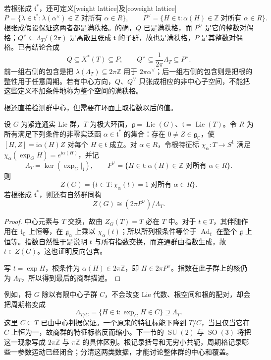 若根张成 \(\mathfrak t^*\)，还可定义[weight lattice]及[coweight lattice]
\[
	P=\{\lambda\in\mathfrak t^*:\lambda(\alpha^\vee)\in\mathbb Z
	\;\text{对所有 }\alpha\in R\},\qquad
	P^\vee=\{H\in\mathfrak t:\alpha(H)\in\mathbb Z
	\;\text{对所有 }\alpha\in R\}.
\]
根张成假设保证这两者都是满秩格。的确，\(Q\) 已是满秩格，而 \(P^\vee\) 是它的整数对偶格；\(Q^\vee\subseteq\Lambda_T/(2\pi)\) 是离散且张成 \(\mathfrak t\) 的子群，故也是满秩格，\(P\) 是其整数对偶格。已有结论合成
\begin{equation}\label{g1:eq:root-lattice-inclusions}
	Q\subseteq X^*(T)\subseteq P,
	\qquad
	Q^\vee\subseteq\frac1{2\pi}\Lambda_T\subseteq P^\vee.
\end{equation}
前一组右侧的包含是把 \(\lambda(\Lambda_T)\subseteq2\pi\mathbb Z\) 用于 \(2\pi\alpha^\vee\)；后一组右侧的包含则是把根的整性用于任意周期。若有中心方向，\(Q\)、\(Q^\vee\) 只张成相应的非中心子空间，不能把这些定义不加条件地称为整个空间的满秩格。

\ProseParagraphBreak
根还直接检测群中心，但需要在环面上取指数以后的值。

\begin{proposition}\label{g1:prop:center-from-roots}
	设 \(G\) 为紧连通实 Lie 群，\(T\) 为极大环面，\(\mathfrak g=\operatorname{Lie}(G)\)、\(\mathfrak t=\operatorname{Lie}(T)\)。令 \(R\) 为所有满足下列条件的非零实泛函 \(\alpha\in\mathfrak t^*\) 的集合：存在 \(0\ne Z\in\mathfrak g_{\mathbb C}\)，使 \([H,Z]=\mathrm{i}\alpha(H)Z\) 对每个 \(H\in\mathfrak t\) 成立。对 \(\alpha\in R\)，令根特征标 \(\chi_\alpha:T\to S^1\) 满足 \(\chi_\alpha(\exp_G H)=e^{\mathrm{i}\alpha(H)}\)，并记
	\[
		\Lambda_T=\ker(\exp_G|_{\mathfrak t}),\qquad
		P^\vee=\{H\in\mathfrak t:\alpha(H)\in\mathbb Z\text{ 对所有 }\alpha\in R\}.
	\]
	则
	\[
		Z(G)=\{t\in T:\chi_\alpha(t)=1\;\text{对所有 }\alpha\in R\}.
	\]
	若根张成 \(\mathfrak t^*\)，则还有自然群同构
	\[
		Z(G)\cong (2\pi P^\vee)/\Lambda_T.
	\]
\end{proposition}
\begin{proof}
	中心元素与 \(T\) 交换，故由 \(Z_G(T)=T\) 必在 \(T\) 中。对于 \(t\in T\)，其伴随作用在 \(\mathfrak t_{\mathbb C}\) 上恒等，在 \(\mathfrak g_\alpha\) 上乘以 \(\chi_\alpha(t)\)；所以所列根条件等价于 \(\operatorname{Ad}_t\) 在整个 \(\mathfrak g\) 上恒等。指数自然性于是说明 \(t\) 与所有指数交换，而连通群由指数生成，故 \(t\in Z(G)\)。这也证明反向包含。

	写 \(t=\exp H\)，根条件为 \(\alpha(H)\in2\pi\mathbb Z\)，即 \(H\in2\pi P^\vee\)。指数在此子群上的核仍为 \(\Lambda_T\)，所以得到最后的商群描述。
\end{proof}

例如，将 \(G\) 除以有限中心子群 \(C\)，不会改变 Lie 代数、根空间和根的配对，却会把周期格变成
\[
	\Lambda_{T/C}=\{H\in\mathfrak t:\exp_GH\in C\}\supseteq\Lambda_T.
\]
这里 \(C\subseteq T\) 已由中心判据保证。一个原来的特征标能下降到 \(T/C\)，当且仅当它在 \(C\) 上恒为一，故商群的特征标格反而缩小。下一节的 \(\operatorname{SU}(2)\) 与 \(\operatorname{SO}(3)\) 将把这一现象写成 \(2\pi\mathbb Z\) 与 \(\pi\mathbb Z\) 的具体区别。根记录括号和无穷小共轭，周期格记录哪些一参数运动已经闭合；分清这两类数据，才能讨论整体群的中心和覆盖。
